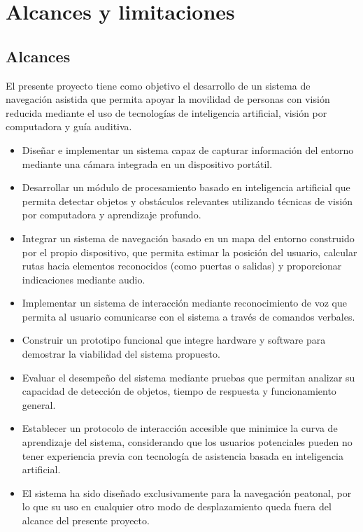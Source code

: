 \section{Alcances y limitaciones}

\subsection{Alcances}
El presente proyecto tiene como objetivo el desarrollo de un sistema de navegación asistida que permita apoyar la movilidad de personas con visión reducida mediante el uso de tecnologías de inteligencia artificial, visión por computadora y guía auditiva.
\begin{itemize}
    \item Diseñar e implementar un sistema capaz de capturar información del entorno mediante una cámara integrada en un dispositivo portátil.
    \item Desarrollar un módulo de procesamiento basado en inteligencia artificial que permita detectar objetos y obstáculos relevantes utilizando técnicas de visión por computadora y aprendizaje profundo.
    \item Integrar un sistema de navegación basado en un mapa del entorno construido por el propio dispositivo, que permita estimar la posición del usuario, calcular rutas hacia elementos reconocidos (como puertas o salidas) y proporcionar indicaciones mediante audio.
    \item Implementar un sistema de interacción mediante reconocimiento de voz que permita al usuario comunicarse con el sistema a través de comandos verbales.
    \item Construir un prototipo funcional que integre hardware y software para demostrar la viabilidad del sistema propuesto.
    \item Evaluar el desempeño del sistema mediante pruebas que permitan analizar su capacidad de detección de objetos, tiempo de respuesta y funcionamiento general.
    \item Establecer un protocolo de interacción accesible que minimice la curva de aprendizaje del sistema, considerando que los usuarios potenciales pueden no tener experiencia previa con tecnología de asistencia basada en inteligencia artificial.
    \item El sistema ha sido diseñado exclusivamente para la navegación peatonal, por lo que su uso en cualquier otro modo de desplazamiento queda fuera del alcance del presente proyecto.
\end{itemize}


